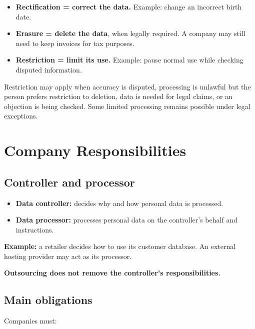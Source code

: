 \documentclass[12pt,a4paper]{report}
\newcommand{\tightlist}{}
\begin{document}
\begin{itemize}
\tightlist
\item
  \textbf{Rectification = correct the data.} Example: change an incorrect birth date.
\item
  \textbf{Erasure = delete the data}, when legally required. A company may still need to keep invoices for tax purposes.
\item
  \textbf{Restriction = limit its use.} Example: pause normal use while checking disputed information.
\end{itemize}

Restriction may apply when accuracy is disputed, processing is unlawful but the person prefers restriction to deletion, data is needed for legal claims, or an objection is being checked. Some limited processing remains possible under legal exceptions.

\hypertarget{company-responsibilities}{%
\section{Company Responsibilities}\label{company-responsibilities}}

\hypertarget{controller-and-processor}{%
\subsection{Controller and processor}\label{controller-and-processor}}

\begin{itemize}
\tightlist
\item
  \textbf{Data controller:} decides why and how personal data is processed.
\item
  \textbf{Data processor:} processes personal data on the controller's behalf and instructions.
\end{itemize}

\textbf{Example:} a retailer decides how to use its customer database. An external hosting provider may act as its processor.

\textbf{Outsourcing does not remove the controller's responsibilities.}

\hypertarget{main-obligations}{%
\subsection{Main obligations}\label{main-obligations}}

Companies must:
\end{document}
